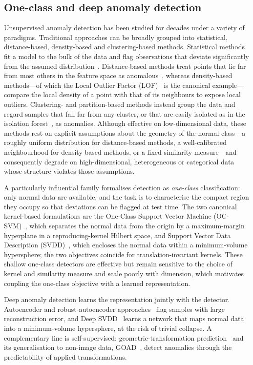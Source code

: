 \documentclass[times, review, 10pt]{elsarticle}
\begin{document}
\subsection{One-class and deep anomaly detection}
\label{subsec:rel-ad}
Unsupervised anomaly detection has been studied for decades under a variety of
paradigms. Traditional approaches can be broadly grouped into statistical,
distance-based, density-based and clustering-based methods. Statistical methods
fit a model to the bulk of the data and flag observations that deviate
significantly from the assumed distribution~\cite{chandola2009survey}.
Distance-based methods treat points that lie far from most others in the feature
space as anomalous~\cite{knorr2000distance}, whereas density-based methods---of
which the Local Outlier Factor (LOF)~\cite{breunig2000lof} is the canonical
example---compare the local density of a point with that of its neighbours to
expose local outliers. Clustering- and partition-based methods instead group the
data and regard samples that fall far from any cluster, or that are easily
isolated as in the isolation forest~\cite{liu2008iforest}, as anomalies. Although effective on low-dimensional data, these
methods rest on explicit assumptions about the geometry of the normal
class---a roughly uniform distribution for distance-based methods, a
well-calibrated neighbourhood for density-based methods, or a fixed similarity
measure---and consequently degrade on high-dimensional, heterogeneous or
categorical data whose structure violates those assumptions.

A particularly influential family formalises detection as \emph{one-class}
classification: only normal data are available, and the task is to characterise
the compact region they occupy so that deviations can be flagged at test time.
The two canonical kernel-based formulations are the One-Class Support Vector
Machine (OC-SVM)~\cite{scholkopf2001ocsvm}, which separates the normal data from
the origin by a maximum-margin hyperplane in a reproducing-kernel Hilbert space,
and Support Vector Data Description (SVDD)~\cite{tax2004svdd}, which encloses the
normal data within a minimum-volume hypersphere; the two objectives coincide for
translation-invariant kernels. These shallow one-class detectors are effective
but remain sensitive to the choice of kernel and similarity measure and scale
poorly with dimension, which motivates coupling the one-class objective with a
learned representation.

Deep anomaly detection learns the representation jointly with the detector.
Autoencoder and robust-autoencoder approaches~\cite{zhou2017rda} flag samples with
large reconstruction error, and Deep SVDD~\cite{ruff2018svdd} learns a network that
maps normal data into a minimum-volume hypersphere, at the risk of trivial
collapse. A complementary line is self-supervised: geometric-transformation
prediction~\cite{golan2018geo} and its generalisation to non-image data,
GOAD~\cite{bergman2020goad}, detect anomalies through the predictability of
applied transformations.
\end{document}
